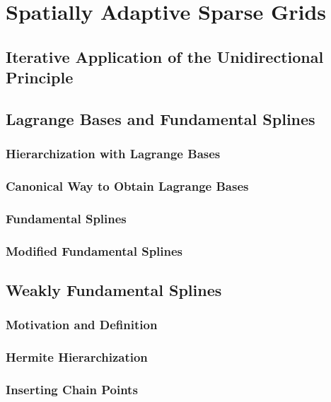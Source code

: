 \section{Spatially Adaptive Sparse Grids}


\subsection{Iterative Application of the Unidirectional Principle}


\subsection{Lagrange Bases and Fundamental Splines}


\subsubsection{Hierarchization with Lagrange Bases}


\subsubsection{Canonical Way to Obtain Lagrange Bases}


\subsubsection{Fundamental Splines}


\subsubsection{Modified Fundamental Splines}


\subsection{Weakly Fundamental Splines}


\subsubsection{Motivation and Definition}


\subsubsection{Hermite Hierarchization}


\subsubsection{Inserting Chain Points}


\cite{zenger91}

\blindmathpaper
